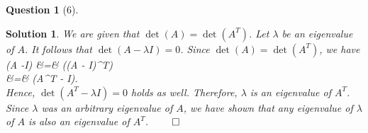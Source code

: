 \documentclass{article} %
\def\eQb#1\eQe{\begin{eqnarray*}#1\end{eqnarray*}}
\theoremstyle{quest}
\newtheorem*{question}{Question}
\newtheorem*{solution}{Solution}
\begin{document}
\bigskip

\begin{question}[6]
\end{question}
\begin{solution}
We are given that $\det(A) = \det(A^T)$. Let $\lambda$ be an eigenvalue
of $A$. It follows that $\det(A - \lambda I ) = 0$. Since
$\det(A) = \det(A^T)$, we have 
\eQb
\det(A -\lambda I) &=& \det((A - \lambda I)^T) \\
&=& \det(A^T - \lambda I). \\
\eQe 
Hence, $\det(A^T - \lambda I) = 0$ holds as well.
Therefore, $\lambda$ is an eigenvalue of $A^T$.
Since $\lambda$ was an arbitrary eigenvalue of $A$, we have shown that 
any eigenvalue of $\lambda$ of $A$ is also an eigenvalue of $A^T$.
\hfill $\qed$ 
\end{solution}
\end{document}
